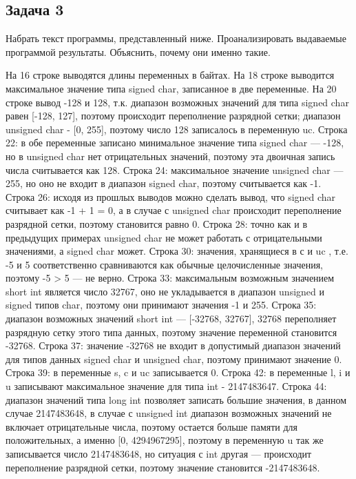 \documentclass[a4paper,14pt]{extarticle}
\begin{document}
\subsection{Задача 3} 
Набрать текст программы, представленный ниже. Проанализировать выдаваемые программой результаты. Объяснить, почему они именно такие.


На 16 строке выводятся длины переменных в байтах. 
На 18 строке выводится максимальное значение типа signed char, записанное в две переменные. На 20 строке вывод -128 и 128, т.к. диапазон возможных значений для типа signed char равен [-128, 127], поэтому происходит переполнение разрядной сетки; диапазон unsigned char - [0, 255], поэтому число 128 записалось в переменную uc. 
Строка 22: в обе переменные записано минимальное значение типа signed char --- -128, но в unsigned char нет отрицательных значений, поэтому эта двоичная запись числа считывается как 128. 
Строка 24: максимальное значение unsigned char --- 255, но оно не входит в диапазон signed char, поэтому считывается как -1. 
Строка 26: исходя из прошлых выводов можно сделать вывод, что signed char считывает как -1 + 1 = 0, а в случае с unsigned char происходит переполнение разрядной сетки, поэтому становится равно 0. 
Строка 28: точно как и в предыдущих примерах unsigned char не может работать с отрицательными значениями, а signed char может. 
Строка 30: значения, хранящиеся в с и uc , т.е. -5 и 5 соответственно сравниваются как обычные целочисленные значения, поэтому -5 > 5 --- не верно. 
Строка 33: максимальным возможным значением short int является число 32767, оно не укладывается в диапазон unsigned и signed типов char, поэтому они принимают значения -1 и 255. 
Строка 35: диапазон возможных значений short int --- [-32768, 32767], 32768 переполняет разрядную сетку этого типа данных, поэтому значение переменной становится -32768. 
Строка 37: значение -32768 не входит в допустимый диапазон значений для типов данных signed char и unsigned char, поэтому принимают значение 0. 
Строка 39: в переменные s, c и uc записывается 0. 
Строка 42: в переменные l, i и u записывают максимальное значение для типа int - 2147483647. 
Строка 44: диапазон значений типа long int позволяет записать большие значения, в данном случае 2147483648, в случае с unsigned int диапазон возможных значений не включает отрицательные числа, поэтому остается больше памяти для положительных, а именно [0, 4294967295], поэтому в переменную u так же записывается число 2147483648, но ситуация с int другая --- происходит переполнение разрядной сетки, поэтому значение становится -2147483648. 
\end{document}
